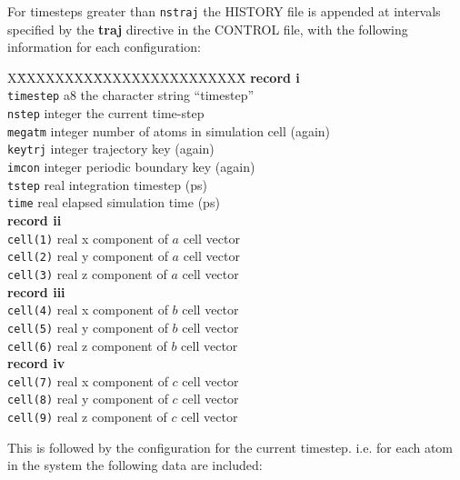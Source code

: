 For timesteps greater than {\tt nstraj} the HISTORY file is
appended at intervals specified by the {\bf traj} directive in the
CONTROL file, with the following information for each
configuration:
\begin{tabbing}
X\=XXXXXXXX\=XXXXXXXXXXXXXXXX\=\kill
{\bf record i} \\
\> {\tt timestep} \> a8      \> the character string ``timestep'' \\
\> {\tt nstep}    \> integer \> the current time-step \\
\> {\tt megatm}   \> integer \> number of atoms in simulation cell (again) \\
\> {\tt keytrj}   \> integer \> trajectory key (again) \\
\> {\tt imcon}    \> integer \> periodic boundary key (again) \\
\> {\tt tstep}    \> real    \> integration timestep (ps) \\
\> {\tt time}     \> real    \> elapsed simulation time (ps) \\
{\bf record ii} \\
\> {\tt cell(1)}  \> real    \> x component of $a$ cell vector \\
\> {\tt cell(2)}  \> real    \> y component of $a$ cell vector \\
\> {\tt cell(3)}  \> real    \> z component of $a$ cell vector \\
{\bf record iii} \\
\> {\tt cell(4)}  \> real    \> x component of $b$ cell vector \\
\> {\tt cell(5)}  \> real    \> y component of $b$ cell vector \\
\> {\tt cell(6)}  \> real    \> z component of $b$ cell vector \\
{\bf record iv} \\
\> {\tt cell(7)}  \> real    \> x component of $c$ cell vector \\
\> {\tt cell(8)}  \> real    \> y component of $c$ cell vector \\
\> {\tt cell(9)}  \> real    \> z component of $c$ cell vector
\end{tabbing}
This is followed by the configuration for the current timestep. i.e.
for each atom in the system the following data are included:

